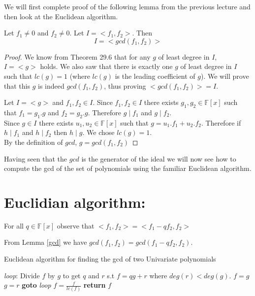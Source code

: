 We will first complete proof of the following lemma from the previous lecture and then look at the Euclidean algorithm.

\begin{lemma}
\label{gcd}
Let $f_1 \neq 0$ and $f_2\neq 0$. Let $I = <f_1, f_2>$. Then
$$I=<gcd(f_1,f_2)>$$
\end{lemma}
\begin{proof}
We know from Theorem 29.6 that for any $g$ of least degree in $I$, $I=<g>$ holds. We also saw that there is exactly one $g$ of least degree in $I$ such that $lc(g)=1$ (where $lc(g)$ is the leading coefficient of $g$). We will prove that this $g$ is indeed $gcd(f_{1},f_{2})$, thus proving $<gcd(f_{1},f_{2})>=I$.

Let $I=<g>$ and $f_{1},f_{2}\in I$. Since $f_{1},f_{2}\in I$ there exists $g_{1},g_{2}\in \mathbb{F}[x]$ such that $f_{1}=g_{1}.g$ and $f_{2}=g_{2}.g$. Therefore $g\mid f_{1}$ and $g\mid f_{2}$. \\

Since $g\in I$ there exists $u_{1},u_{2}\in \mathbb{F}[x]$ such that $g=u_{1}.f_{1}+u_{2}.f_{2}$. Therefore if $h\mid f_{1}$ and 
$h\mid f_{2}$ then $h\mid g$. We chose $lc(g)=1$.\\
By the definition of $gcd$, $g=gcd(f_{1},f_{2})$
\end{proof}

Having seen that the $gcd$ is the generator of the ideal we will now see how to compute the gcd of the set of polynomials using the familiar Euclidean algorithm.


\section*{Euclidian algorithm:}
\begin{observation}
For all $q\in \mathbb{F}[x]$ observe that
$<f_{1},f_{2}>=<f_{1}-qf_{2},f_{2}>$
\end{observation}

From Lemma \ref{gcd} we have $gcd(f_{1},f_{2})=gcd(f_{1}-qf_{2},f_{2})$.


\begin{algorithm}
\caption{Euclidean algorithm for finding the gcd of two Univariate polynomials}
\label{euclid}
\begin{algorithmic}[1]
\State \emph{loop}:
\State Divide $f$ by $g$ to get $q$ and $r$ s.t $f=qg+r$ where $deg(r)< deg(g)$.
\State $f=g$
\State $g=r$
\State \textbf{goto} \emph{loop}
\EndIf
\State $f=\frac{f}{lc(f)}$
\State \textbf{return} $f$
\EndProcedure
\end{algorithmic}
\end{algorithm}



